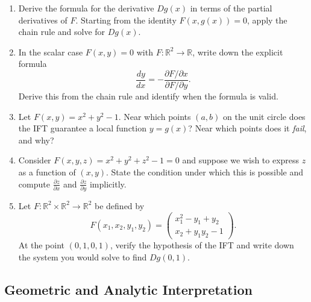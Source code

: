 \begin{enumerate}[resume, leftmargin=*, label=\textbf{Q\arabic*.}]

\item Derive the formula for the derivative $Dg(x)$ in terms of the partial derivatives of $F$. Starting from the identity $F(x, g(x)) = 0$, apply the chain rule and solve for $Dg(x)$.

\item In the scalar case $F(x, y) = 0$ with $F : \mathbb{R}^2 \to \mathbb{R}$, write down the explicit formula
\[
\frac{dy}{dx} = -\frac{\partial F / \partial x}{\partial F / \partial y}.
\]
Derive this from the chain rule and identify when the formula is valid.

\item Let $F(x, y) = x^2 + y^2 - 1$. Near which points $(a,b)$ on the unit circle does the IFT guarantee a local function $y = g(x)$? Near which points does it \emph{fail}, and why?

\item Consider $F(x,y,z) = x^2 + y^2 + z^2 - 1 = 0$ and suppose we wish to express $z$ as a function of $(x,y)$. State the condition under which this is possible and compute $\frac{\partial z}{\partial x}$ and $\frac{\partial z}{\partial y}$ implicitly.

\item Let $F : \mathbb{R}^2 \times \mathbb{R}^2 \to \mathbb{R}^2$ be defined by
\[
F(x_1, x_2, y_1, y_2) = \begin{pmatrix} x_1^2 - y_1 + y_2 \\ x_2 + y_1 y_2 - 1 \end{pmatrix}.
\]
At the point $(0,1,0,1)$, verify the hypothesis of the IFT and write down the system you would solve to find $Dg(0,1)$.

\end{enumerate}

\subsection{Geometric and Analytic Interpretation}

